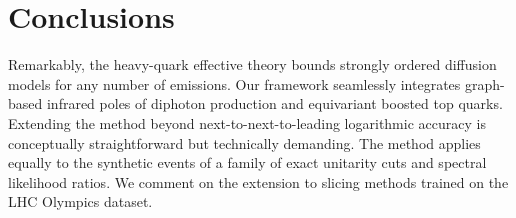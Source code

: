 \section{Conclusions}\label{sec:conclusions}

Remarkably, the heavy-quark effective theory bounds strongly ordered
diffusion models for any number of emissions. Our framework seamlessly
integrates graph-based infrared poles of diphoton production and
equivariant boosted top quarks. Extending the method beyond
next-to-next-to-leading logarithmic accuracy is conceptually
straightforward but technically demanding. The method applies equally to
the synthetic events of a family of exact unitarity cuts and spectral
likelihood ratios. We comment on the extension to slicing methods
trained on the LHC Olympics dataset.

